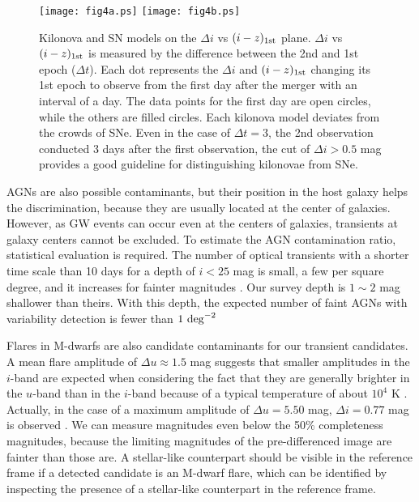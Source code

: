 \documentclass[]{pasj01}
\begin{document}
\begin{figure*}
 \begin{center}
   \texttt{[image: fig4a.ps]}
  \texttt{[image: fig4b.ps]}
 \end{center}
\caption{Kilonova and SN models on the $\Delta i$ vs $(i-z)_{\rm 1st}$ plane.
$\Delta i$ vs $(i-z)_{\rm 1st}$ is measured by the difference between the 2nd and 1st epoch ($\Delta t$).
Each dot represents the $\Delta i$ and $(i-z)_{\rm 1st}$ changing its 1st epoch to observe from the first day after the merger with an interval of a day.
The data points for the first day are open circles, while the others are filled circles.
Each kilonova model deviates  from the crowds of SNe.
Even in the case of $\Delta t=3$, the 2nd observation conducted 3 days after the first observation,
the cut of $\Delta i>0.5$ mag provides a good guideline for distinguishing kilonovae from SNe.
}\label{fig:divsizmodel}
\end{figure*}


AGNs are also possible  contaminants, but their position in the host galaxy helps the discrimination,
because they are usually located at the center of galaxies. 
However, as GW events can occur even at the centers of galaxies,
transients at galaxy centers cannot be excluded.
To estimate the AGN contamination ratio, statistical evaluation is required. 
The number of optical transients with a shorter time scale than 10 days for a depth of $i <25$ mag is small,
a few per square degree, and it increases for fainter magnitudes \citep{2008ApJ...676..163M}.
Our survey depth is $1\sim2$ mag shallower than theirs.
With this depth, the expected number of faint AGNs with variability detection is fewer than $1~{\rm deg}^{-2}$


Flares in M-dwarfs are also candidate contaminants for our transient candidates.
A mean flare amplitude of $\Delta u\approx1.5$ mag \citep{2009AJ....138..633K} suggests that smaller amplitudes in the $i$-band are expected
when considering the fact that they are generally brighter in the $u$-band than in the $i$-band because of a typical temperature of about $10^4$ K \citep{2013ApJ...779...18B}.
Actually, in the case of a maximum amplitude of $\Delta u = 5.50$ mag, $\Delta i = 0.77$ mag is observed \citep{2009AJ....138..633K}.
We can measure magnitudes even below the 50\% completeness magnitudes,
because the limiting magnitudes of the pre-differenced image are fainter than those are.
A stellar-like counterpart should be visible in the reference frame if a detected candidate is an M-dwarf flare,
which can be identified by inspecting the presence of a stellar-like counterpart in the reference frame.
\end{document}
